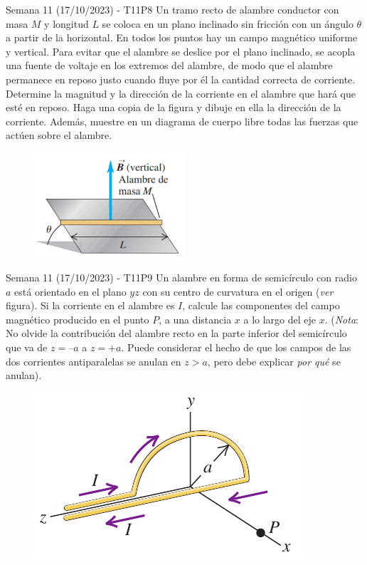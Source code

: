 \begin{frame}{Semana 11 (17/10/2023) - T11P8}
\small
    Un tramo recto de alambre conductor con masa $M$ y 
longitud $L$ se coloca en un plano
inclinado sin fricción con un
ángulo $\theta$ a partir de la horizontal. En todos los puntos hay un campo magnético 
uniforme y vertical. Para 
evitar que el alambre se deslice por el plano inclinado, se acopla una
fuente de voltaje en los extremos del alambre, de modo que el alambre
permanece en reposo justo cuando fluye por él la cantidad correcta 
de corriente. Determine la magnitud y la dirección de la corriente en 
el alambre que hará que esté en reposo. Haga una copia de la figura 
y dibuje en ella la dirección de la corriente. Además, muestre en un
diagrama de cuerpo libre todas las fuerzas que actúen sobre el alambre.

\begin{figure}
    \centering
    \includegraphics[width=0.5\textwidth]{figures/q8.png}
\end{figure}
    
\end{frame}

\begin{frame}{Semana 11 (17/10/2023) - T11P9}
    Un alambre en forma de semicírculo con radio $a$ está orientado en el plano $yz$
con su centro de curvatura en el
origen (\textit{ver} figura). Si la corriente en el alambre es $I$, calcule las componentes del campo magnético producido en el punto $P$, a una distancia $x$ a lo largo del eje $x$. (\textit{Nota}: No olvide la contribución del alambre recto en la parte
inferior del semicírculo que va de $z = –a$ a $z = +a$. Puede considerar
el hecho de que los campos de las dos corrientes antiparalelas se anulan en $z>a$, pero debe explicar \textit{por qué} se anulan).

\begin{figure}
        \centering
        \includegraphics[scale=0.4]{figures/t14p5.png}
    \end{figure}
        \end{frame}

